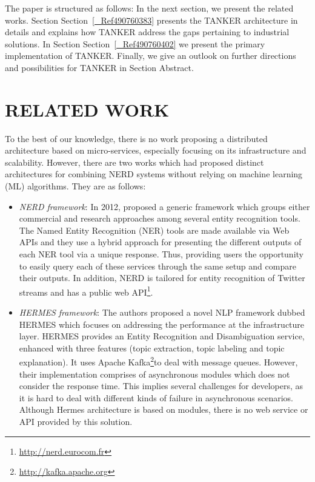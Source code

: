 \documentclass{sig-alternate}
\begin{document}
The paper is structured as follows: In the next section, we present the related works. Section Section~\ref{_Ref490760383} presents the TANKER architecture in details and explains how TANKER address the gaps pertaining to industrial solutions. In Section Section~\ref{_Ref490760402} we present the primary implementation of TANKER. Finally, we give an outlook on further directions and possibilities for TANKER in Section Abstract.

\section{RELATED WORK}

To the best of our knowledge, there is no work proposing a distributed architecture based on micro-services, especially focusing on its infrastructure and scalability. However, there are two works which had proposed distinct architectures for combining NERD systems without relying on machine learning (ML) algorithms. They are as follows:
\begin{itemize}
\item {\em NERD framework}: In 2012, proposed a generic framework which groups either commercial and research approaches among several entity recognition tools. The Named Entity Recognition (NER) tools are made available via Web APIs and they use a hybrid approach for presenting the different outputs of each NER tool via a unique response. Thus, providing users the opportunity to easily query each of these services through the same setup and compare their outputs. In addition, NERD is tailored for entity recognition of Twitter streams and has a public web API\footnote{\url{http://nerd.eurocom.fr}}. 
\item {\em HERMES framework}: The authors proposed a novel NLP framework dubbed HERMES which focuses on addressing the performance at the infrastructure layer. HERMES provides an Entity Recognition and Disambiguation service, enhanced with three features (topic extraction, topic labeling and topic explanation). It uses Apache Kafka\footnote{\url{http://kafka.apache.org}}to deal with message queues. However, their implementation comprises of asynchronous modules which does not consider the response time. This implies several challenges for developers, as it is hard to deal with different kinds of failure in asynchronous scenarios. Although Hermes architecture is based on modules, there is no web service or API provided by this solution.
\end{itemize}
\end{document}
